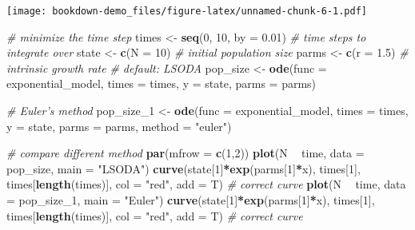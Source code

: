\documentclass[
]{book}
\newenvironment{Shaded}{\begin{snugshade}}{\end{snugshade}}
\newcommand{\CommentTok}[1]{\textcolor[rgb]{0.56,0.35,0.01}{\textit{#1}}}
\newcommand{\DataTypeTok}[1]{\textcolor[rgb]{0.13,0.29,0.53}{#1}}
\newcommand{\DecValTok}[1]{\textcolor[rgb]{0.00,0.00,0.81}{#1}}
\newcommand{\FloatTok}[1]{\textcolor[rgb]{0.00,0.00,0.81}{#1}}
\newcommand{\KeywordTok}[1]{\textcolor[rgb]{0.13,0.29,0.53}{\textbf{#1}}}
\newcommand{\NormalTok}[1]{#1}
\newcommand{\OperatorTok}[1]{\textcolor[rgb]{0.81,0.36,0.00}{\textbf{#1}}}
\newcommand{\StringTok}[1]{\textcolor[rgb]{0.31,0.60,0.02}{#1}}
\begin{document}
\texttt{[image: bookdown-demo\_files/figure-latex/unnamed-chunk-6-1.pdf]}

\begin{Shaded}
\begin{Highlighting}[]
\CommentTok{# minimize the time step}
\NormalTok{times <-}\StringTok{ }\KeywordTok{seq}\NormalTok{(}\DecValTok{0}\NormalTok{, }\DecValTok{10}\NormalTok{, }\DataTypeTok{by =} \FloatTok{0.01}\NormalTok{)  }\CommentTok{# time steps to integrate over}
\NormalTok{state <-}\StringTok{ }\KeywordTok{c}\NormalTok{(}\DataTypeTok{N =} \DecValTok{10}\NormalTok{)  }\CommentTok{# initial population size}
\NormalTok{parms <-}\StringTok{ }\KeywordTok{c}\NormalTok{(}\DataTypeTok{r =} \FloatTok{1.5}\NormalTok{)  }\CommentTok{# intrinsic growth rate}
\CommentTok{# default: LSODA}
\NormalTok{pop_size <-}\StringTok{ }\KeywordTok{ode}\NormalTok{(}\DataTypeTok{func =}\NormalTok{ exponential_model, }\DataTypeTok{times =}\NormalTok{ times, }\DataTypeTok{y =}\NormalTok{ state, }\DataTypeTok{parms =}\NormalTok{ parms)}

\CommentTok{# Euler's method}
\NormalTok{pop_size_}\DecValTok{1}\NormalTok{ <-}\StringTok{ }\KeywordTok{ode}\NormalTok{(}\DataTypeTok{func =}\NormalTok{ exponential_model, }\DataTypeTok{times =}\NormalTok{ times, }\DataTypeTok{y =}\NormalTok{ state, }\DataTypeTok{parms =}\NormalTok{ parms, }\DataTypeTok{method =} \StringTok{"euler"}\NormalTok{)}

\CommentTok{# compare different method}
\KeywordTok{par}\NormalTok{(}\DataTypeTok{mfrow =} \KeywordTok{c}\NormalTok{(}\DecValTok{1}\NormalTok{,}\DecValTok{2}\NormalTok{))}
\KeywordTok{plot}\NormalTok{(N }\OperatorTok{~}\StringTok{ }\NormalTok{time, }\DataTypeTok{data =}\NormalTok{ pop_size, }\DataTypeTok{main =} \StringTok{"LSODA"}\NormalTok{)}
\KeywordTok{curve}\NormalTok{(state[}\DecValTok{1}\NormalTok{]}\OperatorTok{*}\KeywordTok{exp}\NormalTok{(parms[}\DecValTok{1}\NormalTok{]}\OperatorTok{*}\NormalTok{x), times[}\DecValTok{1}\NormalTok{], times[}\KeywordTok{length}\NormalTok{(times)], }\DataTypeTok{col =} \StringTok{"red"}\NormalTok{, }\DataTypeTok{add =}\NormalTok{ T) }\CommentTok{# correct curve}
\KeywordTok{plot}\NormalTok{(N }\OperatorTok{~}\StringTok{ }\NormalTok{time, }\DataTypeTok{data =}\NormalTok{ pop_size_}\DecValTok{1}\NormalTok{, }\DataTypeTok{main =} \StringTok{"Euler"}\NormalTok{)}
\KeywordTok{curve}\NormalTok{(state[}\DecValTok{1}\NormalTok{]}\OperatorTok{*}\KeywordTok{exp}\NormalTok{(parms[}\DecValTok{1}\NormalTok{]}\OperatorTok{*}\NormalTok{x), times[}\DecValTok{1}\NormalTok{], times[}\KeywordTok{length}\NormalTok{(times)], }\DataTypeTok{col =} \StringTok{"red"}\NormalTok{, }\DataTypeTok{add =}\NormalTok{ T) }\CommentTok{# correct curve}
\end{Highlighting}
\end{Shaded}
\end{document}
